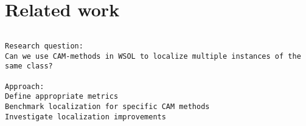 \chapter{Related work}


\begin{verbatim}

\end{verbatim}

\begin{verbatim}
Research question:
Can we use CAM-methods in WSOL to localize multiple instances of the same class?

Approach:
Define appropriate metrics
Benchmark localization for specific CAM methods
Investigate localization improvements
\end{verbatim}